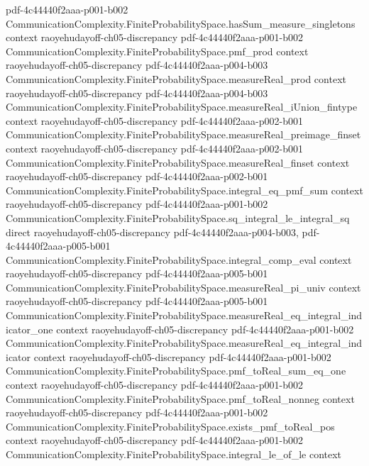 \begin{theorem}
  {pdf-4c44440f2aaa-p001-b002}
\proofstep
  {CommunicationComplexity.FiniteProbabilitySpace.hasSum_measure_singletons}
  {context}
  {raoyehudayoff-ch05-discrepancy}
  {pdf-4c44440f2aaa-p001-b002}
\proofstep
  {CommunicationComplexity.FiniteProbabilitySpace.pmf_prod}
  {context}
  {raoyehudayoff-ch05-discrepancy}
  {pdf-4c44440f2aaa-p004-b003}
\proofstep
  {CommunicationComplexity.FiniteProbabilitySpace.measureReal_prod}
  {context}
  {raoyehudayoff-ch05-discrepancy}
  {pdf-4c44440f2aaa-p004-b003}
\proofstep
  {CommunicationComplexity.FiniteProbabilitySpace.measureReal_iUnion_fintype}
  {context}
  {raoyehudayoff-ch05-discrepancy}
  {pdf-4c44440f2aaa-p002-b001}
\proofstep
  {CommunicationComplexity.FiniteProbabilitySpace.measureReal_preimage_finset}
  {context}
  {raoyehudayoff-ch05-discrepancy}
  {pdf-4c44440f2aaa-p002-b001}
\proofstep
  {CommunicationComplexity.FiniteProbabilitySpace.measureReal_finset}
  {context}
  {raoyehudayoff-ch05-discrepancy}
  {pdf-4c44440f2aaa-p002-b001}
\proofstep
  {CommunicationComplexity.FiniteProbabilitySpace.integral_eq_pmf_sum}
  {context}
  {raoyehudayoff-ch05-discrepancy}
  {pdf-4c44440f2aaa-p001-b002}
\proofstep
  {CommunicationComplexity.FiniteProbabilitySpace.sq_integral_le_integral_sq}
  {direct}
  {raoyehudayoff-ch05-discrepancy}
  {pdf-4c44440f2aaa-p004-b003,
    pdf-4c44440f2aaa-p005-b001}
\proofstep
  {CommunicationComplexity.FiniteProbabilitySpace.integral_comp_eval}
  {context}
  {raoyehudayoff-ch05-discrepancy}
  {pdf-4c44440f2aaa-p005-b001}
\proofstep
  {CommunicationComplexity.FiniteProbabilitySpace.measureReal_pi_univ}
  {context}
  {raoyehudayoff-ch05-discrepancy}
  {pdf-4c44440f2aaa-p005-b001}
\proofstep
  {CommunicationComplexity.FiniteProbabilitySpace.measureReal_eq_integral_indicator_one}
  {context}
  {raoyehudayoff-ch05-discrepancy}
  {pdf-4c44440f2aaa-p001-b002}
\proofstep
  {CommunicationComplexity.FiniteProbabilitySpace.measureReal_eq_integral_indicator}
  {context}
  {raoyehudayoff-ch05-discrepancy}
  {pdf-4c44440f2aaa-p001-b002}
\proofstep
  {CommunicationComplexity.FiniteProbabilitySpace.pmf_toReal_sum_eq_one}
  {context}
  {raoyehudayoff-ch05-discrepancy}
  {pdf-4c44440f2aaa-p001-b002}
\proofstep
  {CommunicationComplexity.FiniteProbabilitySpace.pmf_toReal_nonneg}
  {context}
  {raoyehudayoff-ch05-discrepancy}
  {pdf-4c44440f2aaa-p001-b002}
\proofstep
  {CommunicationComplexity.FiniteProbabilitySpace.exists_pmf_toReal_pos}
  {context}
  {raoyehudayoff-ch05-discrepancy}
  {pdf-4c44440f2aaa-p001-b002}
\proofstep
  {CommunicationComplexity.FiniteProbabilitySpace.integral_le_of_le}
  {context}

\end{theorem}
